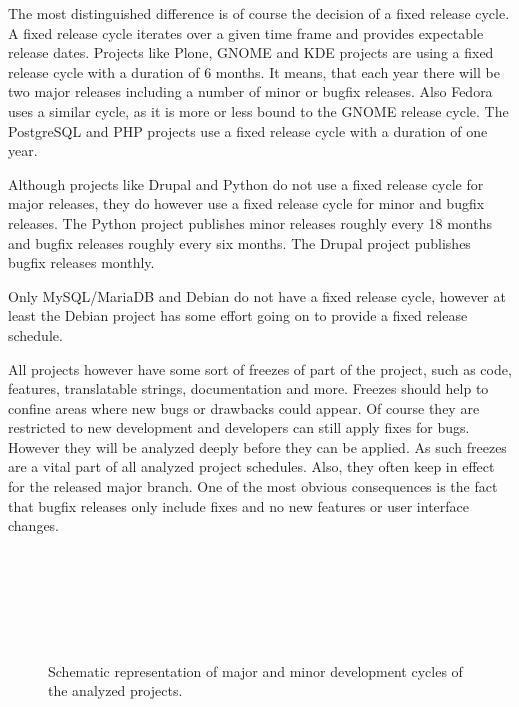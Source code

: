 The most distinguished difference is of course the decision of a fixed release
cycle. A fixed release cycle iterates over a given time frame and provides
expectable release dates. Projects like Plone, GNOME and KDE projects are using
a fixed release cycle with a duration of 6 months. It means, that each year
there will be two major releases including a number of minor or bugfix
releases. Also Fedora uses a similar cycle, as it is more or less bound to the
GNOME release cycle. The PostgreSQL and PHP projects use a fixed release cycle
with a duration of one year.

Although projects like Drupal and Python do not use a fixed release cycle for
major releases, they do however use a fixed release cycle for minor and bugfix
releases. The Python project publishes minor releases roughly every 18 months
and bugfix releases roughly every six months. The Drupal project publishes
bugfix releases monthly.

Only MySQL/MariaDB and Debian do not have a fixed release cycle, however at
least the Debian project has some effort going on to provide a fixed release
schedule.

All projects however have some sort of freezes of part of the project, such as
code, features, translatable strings, documentation and more. Freezes should
help to confine areas where new bugs or drawbacks could appear. Of course they
are restricted to new development and developers can still apply fixes for
bugs. However they will be analyzed deeply before they can be applied. As such
freezes are a vital part of all analyzed project schedules. Also, they often
keep in effect for the released major branch. One of the most obvious
consequences is the fact that bugfix releases only include fixes and no new
features or user interface changes.

\begin{figure}[htbp]
  \centering
   \qquad
   \\

   \qquad
   \\

   \qquad
   \\

   \qquad
   \\

   \qquad
   \\
  \caption[Representation of development cycles]
  {Schematic representation of major and minor development cycles of the
    analyzed projects.}
\end{figure}

